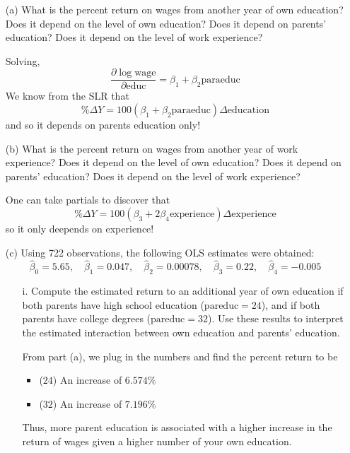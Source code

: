 \documentclass[11pt]{article}
\begin{document}
\begin{enumerate}
    \item[(a)] What is the percent return on wages from another year of own education? Does it depend on the level of own education? Does it depend on parents’ education? Does it depend on the level of work experience?
    \begin{solution}
        Solving, 
        \[\frac{\partial \log \text{wage}}{\partial \text{educ}} = \beta_1 + \beta_2 \text{paraeduc}\] We know from the SLR that 
        \[\% \Delta Y = 100(\beta_1 + \beta_2 \text{paraeduc})\Delta \text{education}\] and so it depends on parents education only!
    \end{solution}
    
    \item[(b)] What is the percent return on wages from another year of work experience? Does it depend on the level of own education? Does it depend on parents’ education? Does it depend on the level of work experience?
    \begin{solution}
        One can take partials to discover that 
        \[\% \Delta Y = 100(\beta_3 + 2\beta_4 \text{experience})\Delta \text{experience}\] so it only deepends on experience!
    \end{solution}
    
    \item[(c)] Using 722 observations, the following OLS estimates were obtained: 
    \[
    \hat{\beta}_0 = 5.65,\quad \hat{\beta}_1 = 0.047,\quad \hat{\beta}_2 = 0.00078,\quad \hat{\beta}_3 = 0.22,\quad \hat{\beta}_4 = -0.005
    \]
    \begin{enumerate}
        \item[i.] Compute the estimated return to an additional year of own education if both parents have high school education ($\text{pareduc} = 24$), and if both parents have college degrees ($\text{pareduc} = 32$). Use these results to interpret the estimated interaction between own education and parents’ education.
        \begin{solution}
            From part (a), we plug in the numbers and find the percent return to be 
            \begin{itemize}
                \item ($24$) An increase of $6.574\%$
                \item ($32$) An increase of $7.196\%$
            \end{itemize}
            Thus, more parent education is associated with a higher increase in the return of wages given a higher number of your own education.
        \end{solution}
        

\end{enumerate}
\end{enumerate}
\end{document}
